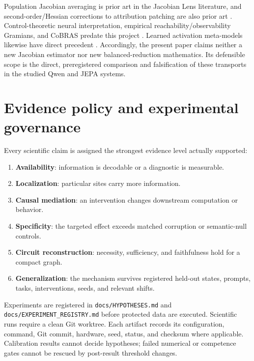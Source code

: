 \documentclass[10pt]{article}
\newcommand{\code}[1]{\texttt{#1}}
\begin{document}
Population Jacobian averaging is prior art in the Jacobian Lens literature,
and second-order/Hessian corrections to attribution patching are also prior art
\cite{zhang2026attributionpatchinglies}.  Control-theoretic neural
interpretation, empirical reachability/observability Gramians, and CoBRAS
predate this project \cite{moon2025controltheoretic,
hamadouche2026minimalrealisation,otto2023cobras}.  Learned activation
meta-models likewise have direct precedent \cite{luo2026generativemetamodel}.
Accordingly, the present paper claims neither a new Jacobian estimator nor new
balanced-reduction mathematics.  Its defensible scope is the direct,
preregistered comparison and falsification of these transports in the studied
Qwen and JEPA systems.

\section{Evidence policy and experimental governance}

Every scientific claim is assigned the strongest evidence level actually
supported:

\begin{enumerate}[leftmargin=*]
  \item \textbf{Availability}: information is decodable or a diagnostic is
  measurable.
  \item \textbf{Localization}: particular sites carry more information.
  \item \textbf{Causal mediation}: an intervention changes downstream
  computation or behavior.
  \item \textbf{Specificity}: the targeted effect exceeds matched corruption
  or semantic-null controls.
  \item \textbf{Circuit reconstruction}: necessity, sufficiency, and
  faithfulness hold for a compact graph.
  \item \textbf{Generalization}: the mechanism survives registered held-out
  states, prompts, tasks, interventions, seeds, and relevant shifts.
\end{enumerate}

Experiments are registered in \code{docs/HYPOTHESES.md} and
\code{docs/EXPERIMENT\_REGISTRY.md} before protected data are executed.
Scientific runs require a clean Git worktree.  Each artifact records its
configuration, command, Git commit, hardware, seed, status, and checksum where
applicable.  Calibration results cannot decide hypotheses; failed numerical or
competence gates cannot be rescued by post-result threshold changes.
\end{document}
